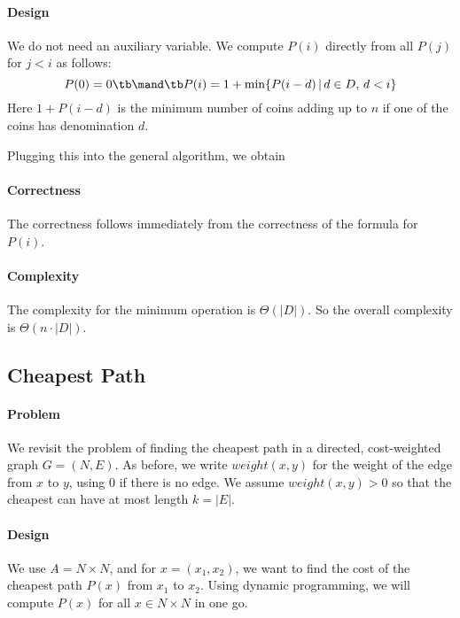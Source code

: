 \paragraph{Design}
We do not need an auxiliary variable.
We compute $P(i)$ directly from all $P(j)$ for $j<i$ as follows:
 \[P(0)=0 \tb\mand\tb P(i)=1+\min \{P(i-d)\,|\,d\in D,\,d<i\}\]
Here $1+P(i-d)$ is the minimum number of coins adding up to $n$ if one of the coins has denomination $d$.

Plugging this into the general algorithm, we obtain

\begin{acode}
\end{acode}

\paragraph{Correctness}
The correctness follows immediately from the correctness of the formula for $P(i)$.

\paragraph{Complexity}
The complexity for the minimum operation is $\Theta(|D|)$.
So the overall complexity is $\Theta(n\cdot |D|)$.

\subsection{Cheapest Path}

\paragraph{Problem}
We revisit the problem of finding the cheapest path in a directed, cost-weighted graph $G=(N,E)$.
As before, we write $weight(x,y)$ for the weight of the edge from $x$ to $y$, using $0$ if there is no edge.
We assume $weight(x,y)>0$ so that the cheapest can have at most length $k=|E|$.

\paragraph{Design}
We use $A=N\times N$, and for $x=(x_1,x_2)$, we want to find the cost of the cheapest path $P(x)$ from $x_1$ to $x_2$.
Using dynamic programming, we will compute $P(x)$ for all $x\in N\times N$ in one go.

